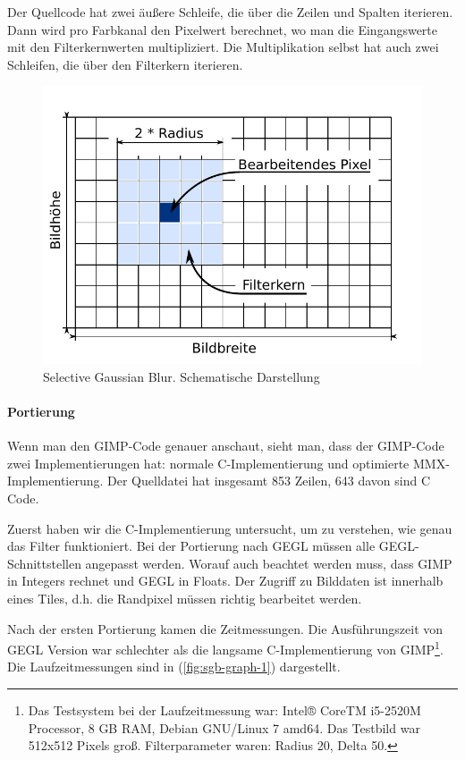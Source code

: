 Der Quellcode hat zwei äußere Schleife, die über die Zeilen und Spalten iterieren. Dann wird pro Farbkanal den Pixelwert berechnet, wo man die Eingangswerte mit den Filterkernwerten multipliziert. Die Multiplikation selbst hat auch zwei Schleifen, die über den Filterkern iterieren.   


\begin{figure}
\centering
\includegraphics[scale=0.9]{graphs/sgb-grid.pdf}
\caption{Selective Gaussian Blur. Schematische Darstellung}
\label{fig:sgb-grid}
\end{figure} 


\paragraph{Portierung}
Wenn man den GIMP-Code genauer anschaut, sieht man, dass der GIMP-Code zwei Implementierungen hat: normale C-Implementierung und optimierte MMX-Implementierung. Der Quelldatei hat insgesamt 853 Zeilen, 643 davon sind C Code. 

Zuerst haben wir die C-Implementierung untersucht, um zu verstehen, wie genau das Filter funktioniert. Bei der Portierung nach GEGL müssen alle GEGL-Schnittstellen angepasst werden. Worauf auch beachtet werden muss, dass GIMP in Integers rechnet und GEGL in Floats. Der Zugriff zu Bilddaten ist innerhalb eines Tiles, d.h. die Randpixel müssen richtig bearbeitet werden. 

Nach der ersten Portierung kamen die Zeitmessungen. Die Ausführungszeit von GEGL Version war schlechter als die langsame C-Implementierung von GIMP\footnote{Das Testsystem bei der Laufzeitmessung war: Intel® CoreTM i5-2520M Processor, 8 GB RAM, Debian GNU/Linux 7 amd64. Das Testbild war 512x512 Pixels groß. Filterparameter waren: Radius 20, Delta 50.}. Die Laufzeitmessungen sind in (\autoref{fig:sgb-graph-1}) dargestellt.

